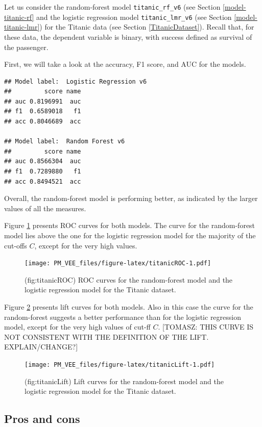 \documentclass[12pt,]{krantz}
\begin{document}
Let us consider the random-forest model \texttt{titanic\_rf\_v6} (see Section \ref{model-titanic-rf} and the logistic regression model \texttt{titanic\_lmr\_v6} (see Section \ref{model-titanic-lmr}) for the Titanic data (see Section \ref{TitanicDataset}). Recall that, for these data, the dependent variable is binary, with success defined as survival of the passenger.

First, we will take a look at the accuracy, F1 score, and AUC for the models.

\begin{verbatim}
## Model label:  Logistic Regression v6 
##         score name
## auc 0.8196991  auc
## f1  0.6589018   f1
## acc 0.8046689  acc

## Model label:  Random Forest v6 
##         score name
## auc 0.8566304  auc
## f1  0.7289880   f1
## acc 0.8494521  acc
\end{verbatim}

Overall, the random-forest model is performing better, as indicated by the larger values of all the measures.

Figure \ref{fig:titanicROC} presents ROC curves for both models. The curve for the random-forest model lies above the one for the logistic regression model for the majority of the cut-offs \(C\), except for the very high values.

\begin{figure}
\centering
\texttt{[image: PM\_VEE\_files/figure-latex/titanicROC-1.pdf]}
\caption{\label{fig:titanicROC}(fig:titanicROC) ROC curves for the random-forest model and the logistic regression model for the Titanic dataset.}
\end{figure}

Figure \ref{fig:titanicLift} presents lift curves for both models. Also in this case the curve for the random-forest suggests a better performance than for the logistic regression model, except for the very high values of cut-ff \(C\). {[}TOMASZ: THIS CURVE IS NOT CONSISTENT WITH THE DEFINITION OF THE LIFT. EXPLAIN/CHANGE?{]}

\begin{figure}
\centering
\texttt{[image: PM\_VEE\_files/figure-latex/titanicLift-1.pdf]}
\caption{\label{fig:titanicLift}(fig:titanicLift) Lift curves for the random-forest model and the logistic regression model for the Titanic dataset.}
\end{figure}

\hypertarget{modelPerformanceProsCons}{%
\subsection{Pros and cons}\label{modelPerformanceProsCons}}
\end{document}
